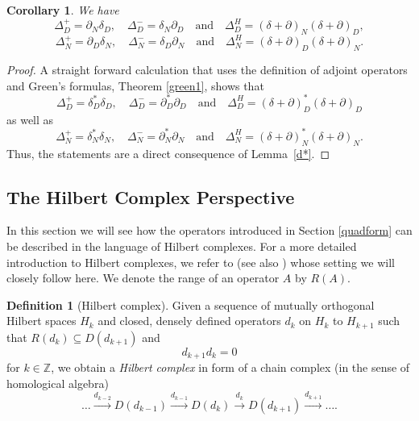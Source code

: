 \documentclass[10pt]{amsart}
\newtheorem{corollary}[theorem]{Corollary}
\theoremstyle{definition}
\newtheorem{definition}[theorem]{Definition}
\begin{document}
\begin{corollary}\label{LNLD}
    We have
    $$\Delta^+_{D} = \partial_N\delta_D,\quad\Delta^-_{D} = \delta_N\partial_D\quad\text{and}\quad\Delta^H_{D}= (\delta+\partial)_N(\delta+\partial)_D,$$
    $$\Delta^+_N = \partial_D\delta_N,\quad\Delta^-_N = \delta_D\partial_N\quad\text{and}\quad\Delta^H_N = (\delta+\partial)_D(\delta+\partial)_N.$$
\end{corollary}
\begin{proof}
A straight forward calculation that uses the definition of adjoint operators and Green's formulas, Theorem \ref{green1}, shows that 
$$\Delta^+_{D} = \delta_D^*\delta_D,\quad\Delta^-_{D} = \partial_D^*\partial_D\quad\text{and}\quad\Delta^H_{D} = (\delta+\partial)^*_D(\delta+\partial)_D$$
as well as 
$$\Delta^+_N = \delta^*_N\delta_N,\quad\Delta^-_N = \partial_N^*\partial_N\quad\text{and}\quad\Delta^H_N = (\delta+\partial)^*_N(\delta+\partial)_N.$$
    Thus, the statements  are a direct consequence of Lemma~\ref{d*}. %
\end{proof}


\subsection{The Hilbert Complex Perspective} \label{Hilbert}

In this section we will see how the operators introduced in Section \ref{quadform} can be described in the language of Hilbert complexes. For a more detailed introduction to Hilbert complexes, we refer to \cite{BL} (see also \cite{HolstStern}) whose setting we will closely follow here. We denote the range of an operator $A$ by $R(A).$

\begin{definition}[Hilbert complex]
Given a sequence of mutually orthogonal Hilbert spaces $H_k$ and closed, densely defined operators $d_{k}$ on $H_{k} $ to $H_{k+1}$ such that $R(d_{k})\subseteq D(d_{k+1})$ and $$d_{k+1}d_k = 0$$ 
for $k\in\mathbb{Z}$,
we obtain a \textit{Hilbert complex} in form of a chain complex (in the sense of homological algebra)
$$\ldots\xrightarrow{d_{k-2}} D(d_{k-1})\xrightarrow{d_{k-1}}D(d_k)\xrightarrow{d_k}D(d_{k+1})\xrightarrow{d_{k+1}}\ldots.$$
\end{definition}
\end{document}

